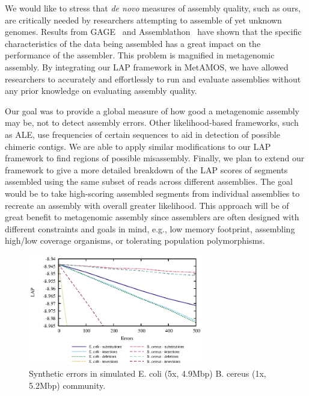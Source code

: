 \documentclass[conference]{IEEEtran}
\begin{document}
We would like to stress that \emph{de novo} measures of assembly quality, such as ours, are critically needed by researchers attempting to assemble of yet unknown genomes.
Results from GAGE~\cite{salzberg2011gage} and Assemblathon~\cite{earl2011assemblathon,bradnam2013assemblathon} have shown that the specific characteristics of the data being assembled has a great impact on the performance of the assembler.
This problem is magnified in metagenomic assembly.
By integrating our LAP framework in MetAMOS, we have allowed researchers to accurately and effortlessly to run and evaluate assemblies without any prior knowledge on evaluating assembly quality.

Our goal was to provide a global measure of how good a metagenomic assembly may be, not to detect assembly errors.
Other likelihood-based frameworks, such as ALE, use frequencies of certain sequences to aid in detection of possible chimeric contigs.
We are able to apply similar modifications to our LAP framework to find regions of possible misassembly.
Finally, we plan to extend our framework to give a more detailed breakdown of the LAP scores of segments assembled using the same subset of reads across different assemblies.
The goal would be to take high-scoring assembled segments from individual assemblies to recreate an assembly with overall greater likelihood.
This approach will be of great benefit to metagenomic assembly since assemblers are often designed with different constraints and goals in mind, e.g., low memory footprint, assembling high/low coverage organisms, or tolerating population polymorphisms.


\begin{figure}[tb!]
\centering
\includegraphics[width=3in]{errors}
\caption{Synthetic errors in simulated E. coli (5x, 4.9Mbp) B. cereus (1x, 5.2Mbp) community.}
\label{fig:errors}
\end{figure}
\end{document}
